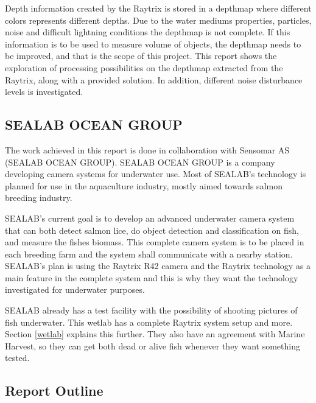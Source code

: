 Depth information created by the Raytrix is stored in a depthmap where different colors represents different depths. Due to the water mediums properties, particles, noise and difficult lightning conditions the depthmap is not complete. If this information is to be used to measure volume of objects, the depthmap needs to be improved, and that is the scope of this project. 
This report shows the exploration of processing possibilities on the depthmap extracted from the Raytrix, along with a provided solution. In addition, different noise disturbance levels is investigated.




\subsection{SEALAB OCEAN GROUP}

The work achieved in this report is done in collaboration with Sensomar AS (SEALAB OCEAN GROUP). 
SEALAB OCEAN GROUP is a company developing camera systems for underwater use. Most of SEALAB's technology is planned for use in the aquaculture industry, mostly aimed towards salmon breeding industry.\cite{website:sealab}

SEALAB's current goal is to develop an advanced underwater camera system that can both detect salmon lice, do object detection and classification on fish, and measure the fishes biomass. This complete camera system is to be placed in each breeding farm and the system shall communicate with a nearby station. SEALAB's plan is using the Raytrix R42 camera and the Raytrix technology as a main feature in the complete system and this is why they want the technology investigated for underwater purposes.

SEALAB already has a test facility with the possibility of shooting pictures of fish underwater. This wetlab has a complete Raytrix system setup and more. Section \ref{wetlab} explains this further. They also have an agreement with Marine Harvest, so they can get both dead or alive fish whenever they want something tested.




\subsection{Report Outline} \label{report_outline}

